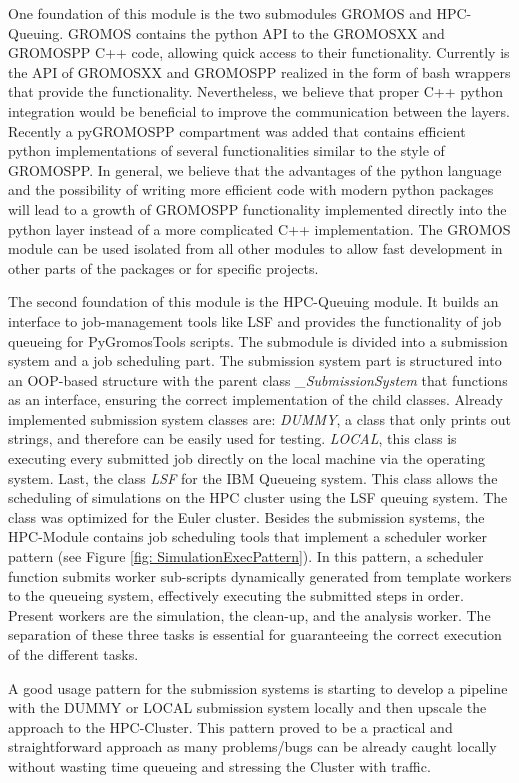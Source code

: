 One foundation of this module is the two submodules GROMOS and HPC-Queuing. GROMOS contains the python API to the GROMOSXX and GROMOSPP C++ code, allowing quick access to their functionality. Currently is the API of GROMOSXX and GROMOSPP realized in the form of bash wrappers that provide the functionality. Nevertheless, we believe that proper C++ python integration would be beneficial to improve the communication between the layers. Recently a pyGROMOSPP compartment was added that contains efficient python implementations of several functionalities similar to the style of GROMOSPP. In general, we believe that the advantages of the python language and the possibility of writing more efficient code with modern python packages will lead to a growth of GROMOSPP functionality implemented directly into the python layer instead of a more complicated C++ implementation. The GROMOS module can be used isolated from all other modules to allow fast development in other parts of the packages or for specific projects.

The second foundation of this module is the HPC-Queuing module. It builds an interface to job-management tools like LSF and provides the functionality of job queueing for PyGromosTools scripts. The submodule is divided into a submission system and a job scheduling part. The submission system part is structured into an OOP-based structure with the parent class \textit{\_SubmissionSystem} that functions as an interface, ensuring the correct implementation of the child classes. Already implemented submission system classes are: 
\textit{DUMMY}, a class that only prints out strings, and therefore can be easily used for testing. \textit{LOCAL}, this class is executing every submitted job directly on the local machine via the operating system. Last, the class \textit{LSF} for the IBM Queueing system. This class allows the scheduling of simulations on the HPC cluster using the LSF queuing system. The class was optimized for the Euler cluster.
Besides the submission systems, the HPC-Module contains job scheduling tools that implement a scheduler worker pattern (see Figure \ref{fig: SimulationExecPattern}). In this pattern, a scheduler function submits worker sub-scripts dynamically generated from template workers to the queueing system, effectively executing the submitted steps in order. Present workers are the simulation, the clean-up, and the analysis worker. The separation of these three tasks is essential for guaranteeing the correct execution of the different tasks.

A good usage pattern for the submission systems is starting to develop a pipeline with the DUMMY or LOCAL submission system locally and then upscale the approach to the HPC-Cluster. This pattern proved to be a practical and straightforward approach as many problems/bugs can be already caught locally without wasting time queueing and stressing the Cluster with traffic.


